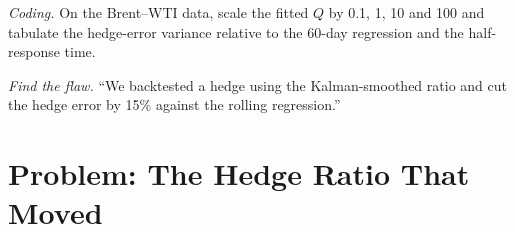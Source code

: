\begin{exercise}[$\star\star\star$]\label{exo:qm:state-space-models-and-the-kalman-filter:7}
\emph{Coding.} On the Brent--WTI data, scale the fitted $Q$ by 0.1, 1, 10 and 100 and tabulate the hedge-error variance relative to the 60-day regression and
the half-response time.
\end{exercise}

\begin{exercise}[$\star\star\star$]\label{exo:qm:state-space-models-and-the-kalman-filter:8}
\emph{Find the flaw.} ``We backtested a hedge using the Kalman-smoothed ratio and cut the hedge error by 15\% against the rolling regression.''
\end{exercise}

\section{Problem: The Hedge Ratio That Moved}

